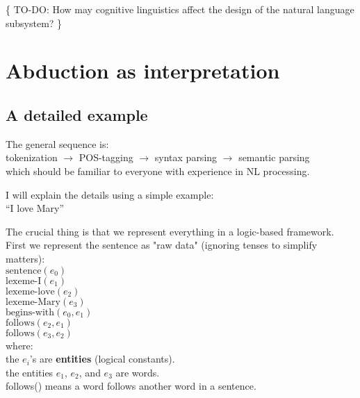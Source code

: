 \{ TO-DO:  How may cognitive linguistics affect the design of the natural language subsystem? \}

\section{Abduction as interpretation}
\label{sec:AbductionAsInterpretation}

\subsection{A detailed example}

The general sequence is:\\
\hspace*{1cm} tokenization $\rightarrow$ POS-tagging $\rightarrow$ syntax parsing $\rightarrow$ semantic parsing\\
which should be familiar to everyone with experience in NL processing.

I will explain the details using a simple example:\\
\hspace*{1cm} ``I love Mary''

The crucial thing is that we represent everything in a logic-based framework. First we represent the sentence as "raw data" (ignoring tenses to simplify matters):\\
\hspace*{1cm} $\mbox{sentence}(e_0)$\\
\hspace*{1cm} $\mbox{lexeme-I}(e_1)$\\
\hspace*{1cm} $\mbox{lexeme-love}(e_2)$\\
\hspace*{1cm} $\mbox{lexeme-Mary}(e_3)$\\
\hspace*{1cm} $\mbox{begins-with}(e_0, e_1)$\\
\hspace*{1cm} $\mbox{follows}(e_2, e_1)$\\
\hspace*{1cm} $\mbox{follows}(e_3, e_2)$\\
where:\\
\hspace*{1cm} the $e_i$'s are \textbf{entities} (logical constants).\\
\hspace*{1cm} the entities $e_1$, $e_2$, and $e_3$ are words.\\
\hspace*{1cm} follows() means a word follows another word in a sentence.

